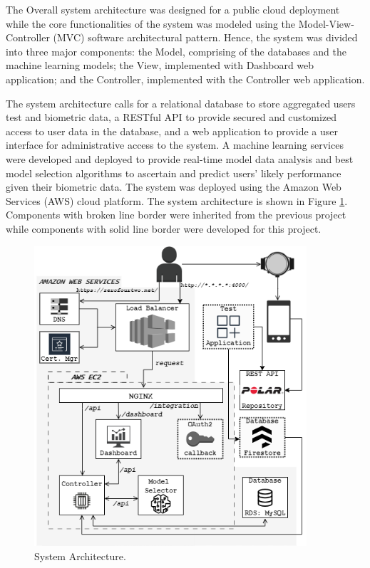 The Overall system architecture was designed for a public cloud deployment while the core functionalities of the system was modeled using the
Model-View-Controller (MVC) software architectural pattern. 
Hence, the system was divided into three major components: the Model, comprising 
of the databases and the machine learning models; the View, implemented with Dashboard web application; and the Controller, implemented with 
the Controller web application. 


The system architecture calls for a relational database to store aggregated users test and biometric data, a RESTful API to provide secured 
and customized access to user data in the database, and a web application to provide a user interface for administrative access to the 
system. A machine learning services were developed and deployed to provide real-time model data analysis and best model selection algorithms  
to ascertain and predict users' likely performance given their biometric data.
The system was deployed using the Amazon Web Services (AWS) cloud platform. The system architecture is shown in Figure \ref{image:sys_architecture}.
Components with broken line border were inherited from the previous project while components with solid line border were developed for this project. 
\begin{figure}[h!]
    \includegraphics[width=0.9\textwidth]{images/sys_architecture.png}
    \caption{System Architecture.}
    \label{image:sys_architecture}
\end{figure}


